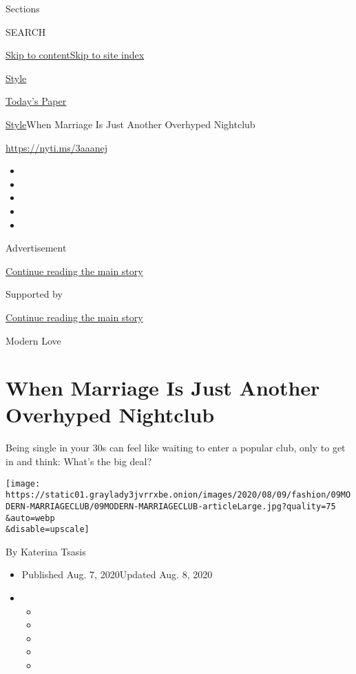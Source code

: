 Sections

SEARCH

\protect\hyperlink{site-content}{Skip to
content}\protect\hyperlink{site-index}{Skip to site index}

\href{https://www.nytimes3xbfgragh.onion/section/style}{Style}

\href{https://myaccount.nytimes3xbfgragh.onion/auth/login?response_type=cookie\&client_id=vi}{}

\href{https://www.nytimes3xbfgragh.onion/section/todayspaper}{Today's
Paper}

\href{/section/style}{Style}\textbar{}When Marriage Is Just Another
Overhyped Nightclub

\url{https://nyti.ms/3aaanej}

\begin{itemize}
\item
\item
\item
\item
\item
\end{itemize}

Advertisement

\protect\hyperlink{after-top}{Continue reading the main story}

Supported by

\protect\hyperlink{after-sponsor}{Continue reading the main story}

Modern Love

\hypertarget{when-marriage-is-just-another-overhyped-nightclub}{%
\section{When Marriage Is Just Another Overhyped
Nightclub}\label{when-marriage-is-just-another-overhyped-nightclub}}

Being single in your 30s can feel like waiting to enter a popular club,
only to get in and think: What's the big deal?

\texttt{[image: https://static01.graylady3jvrrxbe.onion/images/2020/08/09/fashion/09MODERN-MARRIAGECLUB/09MODERN-MARRIAGECLUB-articleLarge.jpg?quality=75\\\&auto=webp\\\&disable=upscale]}

By Katerina Tsasis

\begin{itemize}
\item
  Published Aug. 7, 2020Updated Aug. 8, 2020
\item
  \begin{itemize}
  \item
  \item
  \item
  \item
  \item
  \end{itemize}
\end{itemize}

